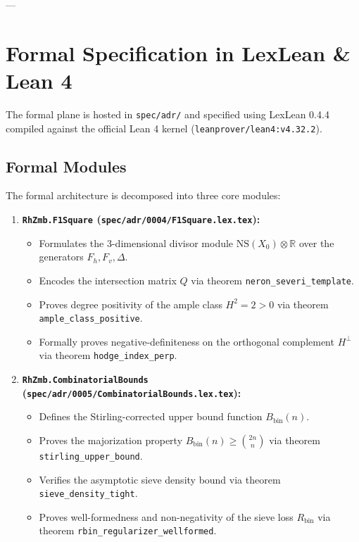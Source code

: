 \documentclass[11pt,a4paper]{article}
\theoremstyle{definition}
\theoremstyle{remark}
\begin{document}
---

\section{Formal Specification in LexLean \& Lean 4}

The formal plane is hosted in \texttt{spec/adr/} and specified using LexLean 0.4.4 compiled against the official Lean 4 kernel (\texttt{leanprover/lean4:v4.32.2}).

\subsection{Formal Modules}
The formal architecture is decomposed into three core modules:

\begin{enumerate}
    \item \textbf{\texttt{RhZmb.F1Square} (\texttt{spec/adr/0004/F1Square.lex.tex}):}
    \begin{itemize}
        \item Formulates the 3-dimensional divisor module $\mathrm{NS}(X_0) \otimes \mathbb{R}$ over the generators $F_h, F_v, \Delta$.
        \item Encodes the intersection matrix $Q$ via theorem \texttt{neron\_severi\_template}.
        \item Proves degree positivity of the ample class $H^2 = 2 > 0$ via theorem \texttt{ample\_class\_positive}.
        \item Formally proves negative-definiteness on the orthogonal complement $H^\perp$ via theorem \texttt{hodge\_index\_perp}.
    \end{itemize}

    \item \textbf{\texttt{RhZmb.CombinatorialBounds} (\texttt{spec/adr/0005/CombinatorialBounds.lex.tex}):}
    \begin{itemize}
        \item Defines the Stirling-corrected upper bound function $B_{\mathrm{bin}}(n)$.
        \item Proves the majorization property $B_{\mathrm{bin}}(n) \ge \binom{2n}{n}$ via theorem \texttt{stirling\_upper\_bound}.
        \item Verifies the asymptotic sieve density bound via theorem \texttt{sieve\_density\_tight}.
        \item Proves well-formedness and non-negativity of the sieve loss $R_{\mathrm{bin}}$ via theorem \texttt{rbin\_regularizer\_wellformed}.
    \end{itemize}


\end{enumerate}
\end{document}
